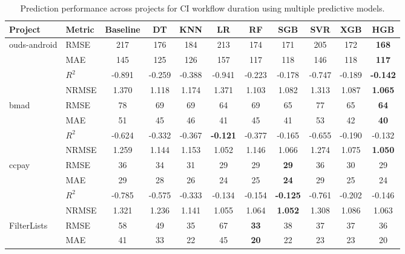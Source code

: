 \documentclass[conference]{IEEEconf}
\newcommand{\ali}[1]{\textcolor{red}{{\it [Ali: #1]}}}
\newcommand{\jasem}[1]{\textcolor{blue}{{\it [Jasem: #1]}}}
\begin{document}
\begin{table}[!tbp]
    \fontsize{6}{6.5}\selectfont
    \tabcolsep=0.01cm
\centering
\renewcommand{\arraystretch}{1.1}
\setlength{\tabcolsep}{3pt}
\caption{Prediction performance across projects for CI workflow duration using multiple predictive models.}
\label{tab:rq1-rmse}
\begin{tabular}{llccccccccc}
\toprule
\textbf{Project} & \textbf{Metric} &
\textbf{Baseline} &
\textbf{DT} & \textbf{KNN} & \textbf{LR} &
\textbf{RF} & \textbf{SGB} & \textbf{SVR} & \textbf{XGB} & \textbf{HGB} \\
\midrule
\multirow{4}{*}{ouds-android} & RMSE & 217 & 176 & 184 & 213 & 174 & 171 & 205 & 172 & \textbf{168} \\
  & MAE & 145 & 125 & 126 & 157 & 117 & 118 & 146 & 118 & \textbf{117} \\
  & $R^2$ & -0.891 & -0.259 & -0.388 & -0.941 & -0.223 & -0.178 & -0.747 & -0.189 & \textbf{-0.142} \\
  & NRMSE & 1.370 & 1.118 & 1.174 & 1.371 & 1.103 & 1.082 & 1.313 & 1.087 & \textbf{1.065} \\
\midrule
\multirow{4}{*}{bmad} & RMSE & 78 & 69 & 69 & 64 & 69 & 65 & 77 & 65 & \textbf{64} \\
  & MAE & 51 & 45 & 46 & 41 & 45 & 41 & 53 & 42 & \textbf{40} \\
  & $R^2$ & -0.624 & -0.332 & -0.367 & \textbf{-0.121} & -0.377 & -0.165 & -0.655 & -0.190 & -0.132 \\
  & NRMSE & 1.259 & 1.144 & 1.153 & 1.052 & 1.146 & 1.066 & 1.274 & 1.075 & \textbf{1.050} \\
\midrule
\multirow{4}{*}{ccpay} & RMSE & 36 & 34 & 31 & 29 & 29 & \textbf{29} & 36 & 30 & 29 \\
  & MAE & 29 & 28 & 26 & 24 & 25 & \textbf{24} & 29 & 25 & 24 \\
  & $R^2$ & -0.785 & -0.575 & -0.333 & -0.134 & -0.154 & \textbf{-0.125} & -0.761 & -0.202 & -0.146 \\
  & NRMSE & 1.321 & 1.236 & 1.141 & 1.055 & 1.064 & \textbf{1.052} & 1.308 & 1.086 & 1.063 \\
\midrule
\multirow{4}{*}{FilterLists} & RMSE & 58 & 49 & 35 & 67 & \textbf{33} & 38 & 37 & 37 & 36 \\
  & MAE & 41 & 33 & 22 & 45 & \textbf{20} & 22 & 23 & 23 & 20 \\

\end{tabular}
\end{table}
\end{document}
